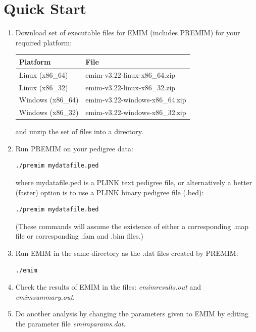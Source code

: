 \documentclass[a4paper,12pt]{article}
\begin{document}
\section{Quick Start}
\label{quick-start}
\begin{enumerate}

\item Download set of executable files for EMIM (includes PREMIM) for your required platform: 
{\begin{center}\begin{tabular}{ll}
Platform  & File\\
\hline
Linux (x86\_64) & emim-v3.22-linux-x86\_64.zip\\
Linux (x86\_32) & emim-v3.22-linux-x86\_32.zip\\
Windows (x86\_64) & emim-v3.22-windows-x86\_64.zip\\
Windows (x86\_32) & emim-v3.22-windows-x86\_32.zip\\
\end{tabular}\end{center}}
and unzip the set of files into a directory. 
\item Run PREMIM on your pedigree data: \vspace{0.35cm} \begin{lstlisting}
./premim mydatafile.ped 
\end{lstlisting} \vspace{0.35cm}where mydatafile.ped is a PLINK text pedigree file, or alternatively a better (faster) option is to use a PLINK binary pedigree file (.bed): \vspace{0.35cm} \begin{lstlisting}
./premim mydatafile.bed 
\end{lstlisting} \vspace{0.35cm}(These commands will assume the existence of either a corresponding .map file or corresponding .fam and .bim files.) 
\item Run EMIM in the same directory as the .dat files created by PREMIM: \vspace{0.35cm} \begin{lstlisting}
./emim 
\end{lstlisting} \vspace{0.35cm}
\item Check the results of EMIM in the files: {\it emimresults.out} and {\it emimsummary.out}. 
\item Do another analysis by changing the parameters given to EMIM by editing the parameter file {\it emimparams.dat}.\end{enumerate}
\end{document}
